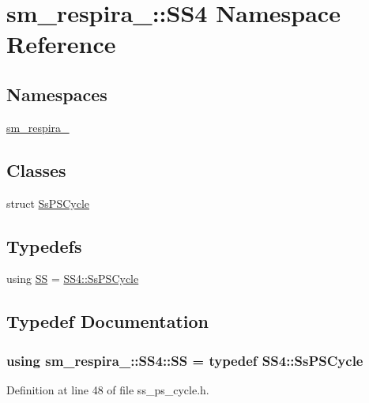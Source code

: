 \hypertarget{namespacesm__respira__1_1_1SS4}{}\section{sm\+\_\+respira\+\_\+:\+:S\+S4 Namespace Reference}
\label{namespacesm__respira__1_1_1SS4}
\subsection*{Namespaces}
\begin{DoxyCompactItemize}
\item 
 \hyperlink{namespacesm__respira__1_1_1SS4_1_1sm__respira__1}{sm\+\_\+respira\+\_}
\end{DoxyCompactItemize}
\subsection*{Classes}
\begin{DoxyCompactItemize}
\item 
struct \hyperlink{structsm__respira__1_1_1SS4_1_1SsPSCycle}{Ss\+P\+S\+Cycle}
\end{DoxyCompactItemize}
\subsection*{Typedefs}
\begin{DoxyCompactItemize}
\item 
using \hyperlink{namespacesm__respira__1_1_1SS4_a80df246d3c72c5fac7bfa7ffc9a91982}{SS} = \hyperlink{structsm__respira__1_1_1SS4_1_1SsPSCycle}{S\+S4\+::\+Ss\+P\+S\+Cycle}
\end{DoxyCompactItemize}


\subsection{Typedef Documentation}
\subsubsection[{\texorpdfstring{SS}{SS}}]{\setlength{\rightskip}{0pt plus 5cm}using {\bf sm\+\_\+respira\+\_\+::\+S\+S4\+::\+SS} = typedef {\bf S\+S4\+::\+Ss\+P\+S\+Cycle}}\hypertarget{namespacesm__respira__1_1_1SS4_a80df246d3c72c5fac7bfa7ffc9a91982}{}\label{namespacesm__respira__1_1_1SS4_a80df246d3c72c5fac7bfa7ffc9a91982}


Definition at line 48 of file ss\+\_\+ps\+\_\+cycle.\+h.

